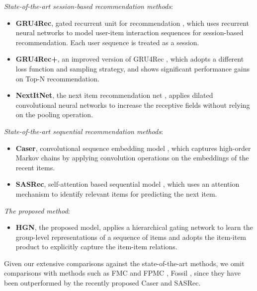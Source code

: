 \documentclass[sigconf]{acmart}
\begin{document}
\textit{State-of-the-art session-based recommendation methods}:
\begin{itemize}
\item \textbf{GRU4Rec}, gated recurrent unit for recommendation \cite{DBLP:journals/corr/HidasiKBT15}, which uses recurrent neural networks to model user-item interaction sequences for session-based recommendation. Each user sequence is treated as a session.
\item \textbf{GRU4Rec+}, an improved version of GRU4Rec \cite{DBLP:conf/cikm/HidasiK18}, which adopts a different loss function and sampling strategy, and shows significant performance gains on Top-N recommendation.
\item \textbf{NextItNet}, the next item recommendation net \cite{DBLP:conf/wsdm/YuanKAJ019}, applies dilated convolutional neural networks to increase the receptive fields without relying on the pooling operation.
\end{itemize}

\textit{State-of-the-art sequential recommendation methods}:
\begin{itemize}
\item \textbf{Caser}, convolutional sequence embedding model \cite{DBLP:conf/wsdm/TangW18}, which captures high-order Markov chains by applying convolution operations on the embeddings of the  recent items.
\item \textbf{SASRec}, self-attention based sequential model \cite{DBLP:conf/icdm/KangM18}, which uses an attention mechanism to identify relevant items for predicting the next item.
\end{itemize}

\textit{The proposed method}:
\begin{itemize}
\item \textbf{HGN}, the proposed model, applies a hierarchical gating network to learn the group-level representations of a sequence of items and adopts the item-item product to explicitly capture the item-item relations.
\end{itemize}

Given our extensive comparisons against the state-of-the-art methods, we omit comparisons with methods such as FMC and FPMC \cite{DBLP:conf/www/RendleFS10}, Fossil \cite{DBLP:conf/icdm/HeM16}, since they have been outperformed by the recently proposed Caser and SASRec.
\end{document}
